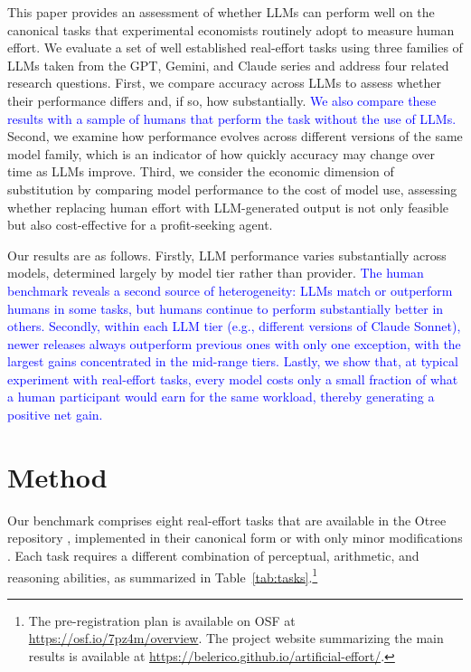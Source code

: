 \documentclass[12pt,a4paper]{article}
\newcommand{\blue}[1]{\textcolor{blue}{#1}}
\begin{document}
This paper provides an assessment of whether LLMs can perform well on the canonical tasks that experimental economists routinely adopt to measure human effort. We evaluate a set of well established real-effort tasks using three families of LLMs taken from the GPT, Gemini, and Claude series and address four related research questions. First, we compare accuracy across LLMs to assess whether their performance differs and, if so, how substantially. \blue{We also compare these results with a sample of humans that perform the task without the use of LLMs.} Second, we examine how performance evolves across different versions of the same model family, which is an indicator of how quickly accuracy may change over time as LLMs improve. Third, we consider the economic dimension of substitution by comparing model performance to the cost of model use, %
assessing whether replacing human effort with LLM-generated output is not only feasible but also cost-effective for a profit-seeking agent.

Our results are as follows.
Firstly, LLM performance varies substantially across models, determined largely by model tier rather than provider. \blue{The human benchmark reveals a second source of heterogeneity: LLMs match or outperform humans in some tasks, but humans continue to perform substantially better in others.
Secondly, within each LLM tier (e.g., different versions of Claude Sonnet), newer releases always outperform previous ones with only one exception, with the largest gains concentrated in the mid-range tiers.
Lastly, we show that, at typical experiment with real-effort tasks, every model costs only a small fraction of what a human participant would earn for the same workload, thereby generating a positive net gain.}

\section{Method}

Our benchmark comprises eight real-effort tasks that are available in the Otree repository \citep{chen2016otree}, implemented in their canonical form or with only minor modifications \citep{charness2018experimental}. Each task requires a different combination of perceptual, arithmetic, and reasoning abilities, as summarized in Table~\ref{tab:tasks}.\footnote{The pre-registration plan is available on OSF at \url{https://osf.io/7pz4m/overview}. The project website summarizing the main results is available at \url{https://belerico.github.io/artificial-effort/}.}
\end{document}
